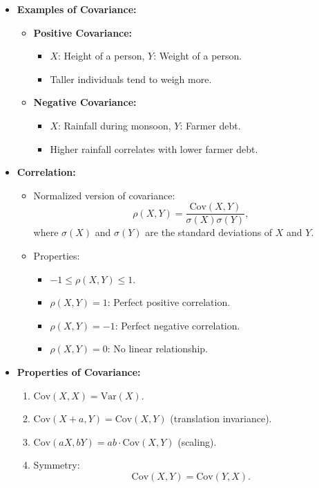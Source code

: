 \documentclass{article}
\begin{document}
\begin{itemize}
  \item \textbf{Examples of Covariance:}
    \begin{itemize}
      \item \textbf{Positive Covariance:}
        \begin{itemize}
          \item $X$: Height of a person, $Y$: Weight of a person.
          \item Taller individuals tend to weigh more.
        \end{itemize}
      \item \textbf{Negative Covariance:}
        \begin{itemize}
          \item $X$: Rainfall during monsoon, $Y$: Farmer debt.
          \item Higher rainfall correlates with lower farmer debt.
        \end{itemize}
    \end{itemize}

  \item \textbf{Correlation:}
    \begin{itemize}
      \item Normalized version of covariance:
        \[
          \rho(X, Y) = \frac{\text{Cov}(X, Y)}{\sigma(X)\sigma(Y)},
        \]
        where $\sigma(X)$ and $\sigma(Y)$ are the standard deviations of $X$ and $Y$.
      \item Properties:
        \begin{itemize}
          \item $-1 \leq \rho(X, Y) \leq 1$.
          \item $\rho(X, Y) = 1$: Perfect positive correlation.
          \item $\rho(X, Y) = -1$: Perfect negative correlation.
          \item $\rho(X, Y) = 0$: No linear relationship.
        \end{itemize}
    \end{itemize}

  \item \textbf{Properties of Covariance:}
    \begin{enumerate}
      \item $\text{Cov}(X, X) = \text{Var}(X)$.
      \item $\text{Cov}(X + a, Y) = \text{Cov}(X, Y)$ (translation invariance).
      \item $\text{Cov}(aX, bY) = ab \cdot \text{Cov}(X, Y)$ (scaling).
      \item Symmetry:
        \[
          \text{Cov}(X, Y) = \text{Cov}(Y, X).
        \]
    \end{enumerate}


\end{itemize}
\end{document}
